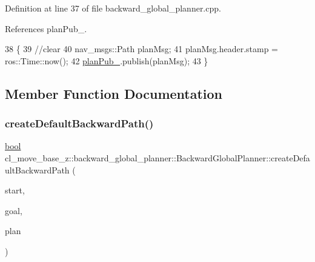 Definition at line 37 of file backward\+\_\+global\+\_\+planner.\+cpp.



References plan\+Pub\+\_\+.


\begin{DoxyCode}
38 \{
39     \textcolor{comment}{//clear}
40     nav\_msgs::Path planMsg;
41     planMsg.header.stamp = ros::Time::now();
42     \hyperlink{classcl__move__base__z_1_1backward__global__planner_1_1BackwardGlobalPlanner_a561eab039140948c52ec928c191f3f43}{planPub\_}.publish(planMsg);
43 \}
\end{DoxyCode}


\subsection{Member Function Documentation}
\mbox{\label{classcl__move__base__z_1_1backward__global__planner_1_1BackwardGlobalPlanner_a1b4d2eb717f9f63f2309def37c6ce297}} 
\subsubsection{\texorpdfstring{create\+Default\+Backward\+Path()}{createDefaultBackwardPath()}}
{\footnotesize\ttfamily \hyperlink{classbool}{bool} cl\+\_\+move\+\_\+base\+\_\+z\+::backward\+\_\+global\+\_\+planner\+::\+Backward\+Global\+Planner\+::create\+Default\+Backward\+Path (\begin{DoxyParamCaption}\item[{const geometry\+\_\+msgs\+::\+Pose\+Stamped \&}]{start,  }\item[{const geometry\+\_\+msgs\+::\+Pose\+Stamped \&}]{goal,  }\item[{std\+::vector$<$ geometry\+\_\+msgs\+::\+Pose\+Stamped $>$ \&}]{plan }\end{DoxyParamCaption})\hspace{0.3cm}{\ttfamily [virtual]}}

